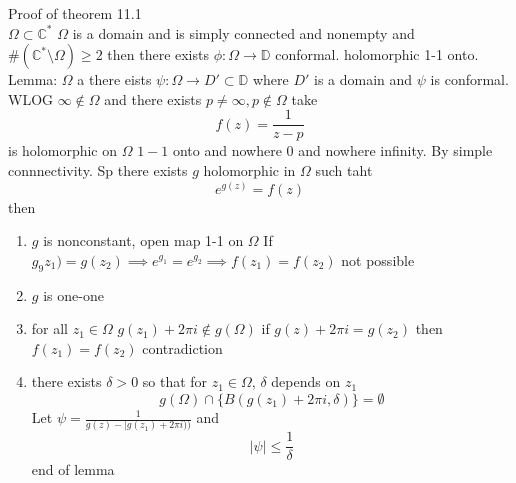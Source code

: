 \documentclass[11pt]{article}
\begin{document}
Proof of theorem 11.1\\
$\Omega \subset \mathbb{C}^{*}$ $\Omega$ is a domain and is simply connected and nonempty and $\#( \mathbb{C}^{*} \setminus \Omega) \ge 2$
then there exists  $\phi : \Omega \to \mathbb{D}$ conformal. holomorphic 1-1 onto.\\
Lemma: $\Omega$ a there eists  $\psi : \Omega \to D' \subset \mathbb{D}$ where $D'$ is a domain and  $\psi$ is conformal.
WLOG  $\infty \not\in \Omega$ and there exists $p \ne \infty, p \not\in \Omega$ take
\[
f(z) = \frac{1}{z-p} 
\] 
is holomorphic on $\Omega$  $1-1$ onto and nowhere 0 and nowhere infinity. By simple connnectivity.
Sp there exists  $g$ holomorphic in $\Omega$ such taht
 \[
e^{g(z)} = f(z)
\] 
then
\begin{enumerate}
    \item $g$ is nonconstant, open  map 1-1 on $\Omega$
        If  $g_9z_1) = g(z_2) \implies e^{g_1} = e^{g_2} \implies f(z_1) = f(z_2)$ not possible
    \item $g$ is one-one
    \item for all  $z_1 \in \Omega$ $g(z_1) + 2\pi i \not\in g(\Omega)$ if $g(z) + 2\pi i = g(z_2)$ then $f(z_1) = f(z_2)$  contradiction
    \item there exists $\delta > 0$ so that for $z_1 \in \Omega$, $\delta$ depends on $z_1$
        \[
            g(\Omega) \cap \{B(g(z_1) + 2\pi i, \delta)\} = \emptyset
        \] 
        Let $\psi = \frac{1}{g(z) - |g(z_1) + 2\pi i))}$ and 
        \[
        |\psi| \le \frac{1}{\delta}
        \] 
        end of lemma
\end{enumerate}
\end{document}
